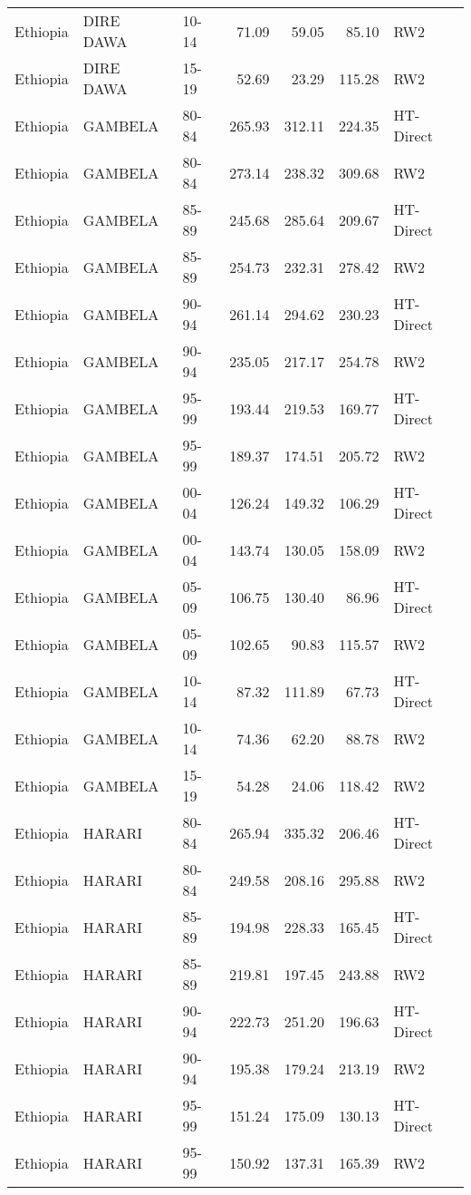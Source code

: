 \begin{longtable}{lllrrrl}
  Ethiopia & DIRE DAWA & 10-14 & 71.09 & 59.05 & 85.10 & RW2 \\ 
  Ethiopia & DIRE DAWA & 15-19 & 52.69 & 23.29 & 115.28 & RW2 \\ 
  Ethiopia & GAMBELA & 80-84 & 265.93 & 312.11 & 224.35 & HT-Direct \\ 
  Ethiopia & GAMBELA & 80-84 & 273.14 & 238.32 & 309.68 & RW2 \\ 
  Ethiopia & GAMBELA & 85-89 & 245.68 & 285.64 & 209.67 & HT-Direct \\ 
  Ethiopia & GAMBELA & 85-89 & 254.73 & 232.31 & 278.42 & RW2 \\ 
  Ethiopia & GAMBELA & 90-94 & 261.14 & 294.62 & 230.23 & HT-Direct \\ 
  Ethiopia & GAMBELA & 90-94 & 235.05 & 217.17 & 254.78 & RW2 \\ 
  Ethiopia & GAMBELA & 95-99 & 193.44 & 219.53 & 169.77 & HT-Direct \\ 
  Ethiopia & GAMBELA & 95-99 & 189.37 & 174.51 & 205.72 & RW2 \\ 
  Ethiopia & GAMBELA & 00-04 & 126.24 & 149.32 & 106.29 & HT-Direct \\ 
  Ethiopia & GAMBELA & 00-04 & 143.74 & 130.05 & 158.09 & RW2 \\ 
  Ethiopia & GAMBELA & 05-09 & 106.75 & 130.40 & 86.96 & HT-Direct \\ 
  Ethiopia & GAMBELA & 05-09 & 102.65 & 90.83 & 115.57 & RW2 \\ 
  Ethiopia & GAMBELA & 10-14 & 87.32 & 111.89 & 67.73 & HT-Direct \\ 
  Ethiopia & GAMBELA & 10-14 & 74.36 & 62.20 & 88.78 & RW2 \\ 
  Ethiopia & GAMBELA & 15-19 & 54.28 & 24.06 & 118.42 & RW2 \\ 
  Ethiopia & HARARI & 80-84 & 265.94 & 335.32 & 206.46 & HT-Direct \\ 
  Ethiopia & HARARI & 80-84 & 249.58 & 208.16 & 295.88 & RW2 \\ 
  Ethiopia & HARARI & 85-89 & 194.98 & 228.33 & 165.45 & HT-Direct \\ 
  Ethiopia & HARARI & 85-89 & 219.81 & 197.45 & 243.88 & RW2 \\ 
  Ethiopia & HARARI & 90-94 & 222.73 & 251.20 & 196.63 & HT-Direct \\ 
  Ethiopia & HARARI & 90-94 & 195.38 & 179.24 & 213.19 & RW2 \\ 
  Ethiopia & HARARI & 95-99 & 151.24 & 175.09 & 130.13 & HT-Direct \\ 
  Ethiopia & HARARI & 95-99 & 150.92 & 137.31 & 165.39 & RW2 \\ 

\end{longtable}
